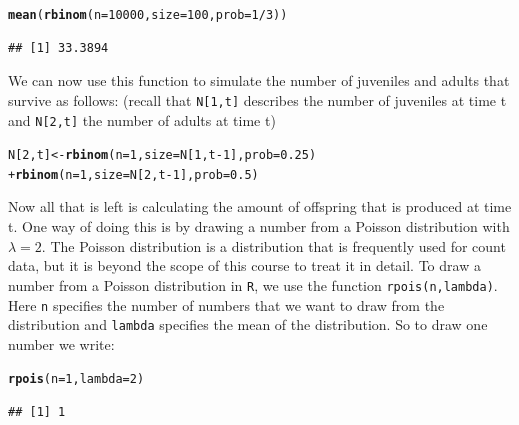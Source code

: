 \documentclass{article}\usepackage[]{graphicx}\usepackage[]{color}
\makeatletter
\newcommand{\hlnum}[1]{\textcolor[rgb]{0.686,0.059,0.569}{#1}}%
\newcommand{\hlopt}[1]{\textcolor[rgb]{0,0,0}{#1}}%
\newcommand{\hlstd}[1]{\textcolor[rgb]{0.345,0.345,0.345}{#1}}%
\newcommand{\hlkwb}[1]{\textcolor[rgb]{0.69,0.353,0.396}{#1}}%
\newcommand{\hlkwc}[1]{\textcolor[rgb]{0.333,0.667,0.333}{#1}}%
\newcommand{\hlkwd}[1]{\textcolor[rgb]{0.737,0.353,0.396}{\textbf{#1}}}%
\newenvironment{kframe}{%
 \def\at@end@of@kframe{}%
 \ifinner\ifhmode%
  \def\at@end@of@kframe{\end{minipage}}%
  \begin{minipage}{\columnwidth}%
 \fi\fi%
 \def\FrameCommand##1{\hskip\@totalleftmargin \hskip-\fboxsep
 \colorbox{shadecolor}{##1}\hskip-\fboxsep
     \hskip-\linewidth \hskip-\@totalleftmargin \hskip\columnwidth}%
 \MakeFramed {\advance\hsize-\width
   \@totalleftmargin\z@ \linewidth\hsize
   \@setminipage}}%
 {\par\unskip\endMakeFramed%
 \at@end@of@kframe}
\newenvironment{knitrout}{}{} %
\makeatother
\begin{document}
\begin{knitrout}
\color{fgcolor}\begin{kframe}
\begin{alltt}
\hlkwd{mean}\hlstd{(}\hlkwd{rbinom}\hlstd{(}\hlkwc{n}\hlstd{=}\hlnum{10000}\hlstd{,}\hlkwc{size}\hlstd{=}\hlnum{100}\hlstd{,}\hlkwc{prob}\hlstd{=}\hlnum{1}\hlopt{/}\hlnum{3}\hlstd{))}
\end{alltt}
\begin{verbatim}
## [1] 33.3894
\end{verbatim}
\end{kframe}
\end{knitrout}
We can now use this function to simulate the number of juveniles and adults that survive as follows:
(recall that \texttt{N[1,t]} describes the number of juveniles at time t and \texttt{N[2,t]} the number of adults at time t)
\begin{knitrout}
\color{fgcolor}\begin{kframe}
\begin{alltt}
\hlstd{N[}\hlnum{2}\hlstd{,t]}\hlkwb{<-}\hlkwd{rbinom}\hlstd{(}\hlkwc{n}\hlstd{=}\hlnum{1}\hlstd{,}\hlkwc{size}\hlstd{=N[}\hlnum{1}\hlstd{,t}\hlopt{-}\hlnum{1}\hlstd{],}\hlkwc{prob}\hlstd{=}\hlnum{0.25}\hlstd{)}
        \hlopt{+} \hlkwd{rbinom}\hlstd{(}\hlkwc{n}\hlstd{=}\hlnum{1}\hlstd{,}\hlkwc{size}\hlstd{=N[}\hlnum{2}\hlstd{,t}\hlopt{-}\hlnum{1}\hlstd{],}\hlkwc{prob}\hlstd{=}\hlnum{0.5}\hlstd{)}
\end{alltt}
\end{kframe}
\end{knitrout}
Now all that is left is calculating the amount of offspring that is produced at time t. One way of doing this is by drawing a number from a Poisson distribution with $\lambda=2$. The Poisson distribution is a distribution that is frequently used for count data, but it is beyond the scope of this course to treat it in detail. To draw a number from a Poisson distribution in \texttt{R}, we use the function \texttt{rpois(n,lambda)}. Here \texttt{n} specifies the number of numbers that we want to draw from the distribution and \texttt{lambda} specifies the mean of the distribution. So to draw one number we write:
\begin{knitrout}
\color{fgcolor}\begin{kframe}
\begin{alltt}
\hlkwd{rpois}\hlstd{(}\hlkwc{n}\hlstd{=}\hlnum{1}\hlstd{,}\hlkwc{lambda}\hlstd{=}\hlnum{2}\hlstd{)}
\end{alltt}
\begin{verbatim}
## [1] 1
\end{verbatim}
\end{kframe}
\end{knitrout}
\end{document}
